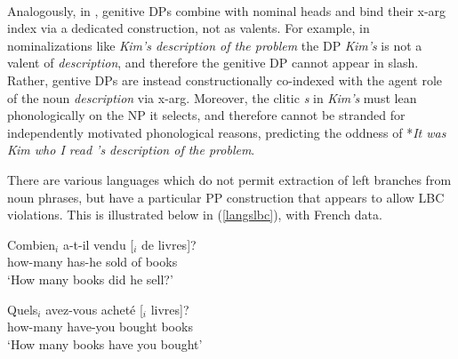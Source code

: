 \documentclass[output=paper
	        ,collection
	        ,collectionchapter
 	        ,biblatex
                ,babelshorthands
                ,newtxmath
                ,draftmode
                ,colorlinks, citecolor=brown
]{langscibook}
\begin{document}
\ea
{}
\zlast

\noindent\\
Analogously, in  \citet[133]{cxsag07},  genitive DPs combine with nominal heads and bind their {\sc x-arg} index via a dedicated  construction, not as valents.
For example,  in nominalizations like \emph{Kim's description of the problem} the  DP \emph{Kim's} is not a valent of \emph{description}, and  therefore the genitive DP cannot appear in {\sc slash}.
 Rather, gentive DPs are instead constructionally co-indexed with the agent role of the noun \emph{description}  via {\sc x-arg}.  
 Moreover, the clitic \emph{s} in \emph{Kim's} must lean phonologically on the NP it selects, and therefore cannot be stranded for independently motivated phonological reasons, predicting  the oddness of *\emph{It was Kim who I read 's description of the problem}.

There are various  languages  which do not permit extraction of left branches from noun phrases, 
but have a particular PP construction that appears to allow LBC violations.
This is illustrated below in (\ref{langslbc}), with French data. 

\eal
\ex \gll Combien$_i$  a-t-il  vendu  [\spc$_i$  de  livres]?\\
how-many  has-he  sold {} of  books\\
\glt `How many books did he sell?'

\ex \gll Quels$_i$  avez-vous  achet\'{e}  [\spc$_i$  livres]?\\
how-many  have-you  bought {}  books\\
\glt `How many books have you bought' 
\end{document}
